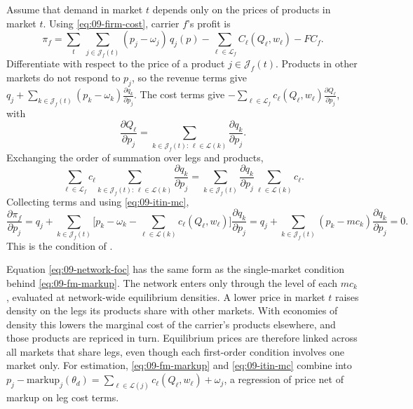 Assume that demand in market $t$ depends only on the prices of products in market $t$. Using
\eqref{eq:09-firm-cost}, carrier $f$'s profit is
\begin{equation*}
\pi_f=\sum_t\ \sum_{j\in\mathcal{J}_f(t)}(p_j-\omega_j)\,q_j(p)-\sum_{\ell\in\mathcal{L}_f}C_\ell(Q_\ell,w_\ell)-FC_f .
\end{equation*}
Differentiate with respect to the price of a product $j\in\mathcal{J}_f(t)$. Products in other markets do
not respond to $p_j$, so the revenue terms give
$q_j+\sum_{k\in\mathcal{J}_f(t)}(p_k-\omega_k)\frac{\partial q_k}{\partial p_j}$. The cost terms give
$-\sum_{\ell\in\mathcal{L}_f}c_\ell(Q_\ell,w_\ell)\frac{\partial Q_\ell}{\partial p_j}$, with
\begin{equation*}
\frac{\partial Q_\ell}{\partial p_j}=\sum_{k\in\mathcal{J}_f(t):\,\ell\in\mathcal{L}(k)}\frac{\partial q_k}{\partial p_j}.
\end{equation*}
Exchanging the order of summation over legs and products,
\begin{equation*}
\sum_{\ell\in\mathcal{L}_f}c_\ell\sum_{k\in\mathcal{J}_f(t):\,\ell\in\mathcal{L}(k)}\frac{\partial q_k}{\partial p_j}
=\sum_{k\in\mathcal{J}_f(t)}\frac{\partial q_k}{\partial p_j}\sum_{\ell\in\mathcal{L}(k)}c_\ell .
\end{equation*}
Collecting terms and using \eqref{eq:09-itin-mc},
\begin{equation}\label{eq:09-network-foc}
\frac{\partial\pi_f}{\partial p_j}
=q_j+\sum_{k\in\mathcal{J}_f(t)}\Big[p_k-\omega_k-\sum_{\ell\in\mathcal{L}(k)}c_\ell(Q_\ell,w_\ell)\Big]\frac{\partial q_k}{\partial p_j}
=q_j+\sum_{k\in\mathcal{J}_f(t)}(p_k-mc_k)\frac{\partial q_k}{\partial p_j}=0 .
\end{equation}
This is the condition of \citet[p.~15]{BerryCarnallSpiller2006}.

Equation \eqref{eq:09-network-foc} has the same form as the single-market condition behind
\eqref{eq:09-fm-markup}. The network enters only through the level of each $mc_k$, evaluated at
network-wide equilibrium densities. A lower price in market $t$ raises density on the legs its products
share with other markets. With economies of density this lowers the marginal cost of the carrier's
products elsewhere, and those products are repriced in turn. Equilibrium prices are therefore linked
across all markets that share legs, even though each first-order condition involves one market only. For
estimation, \eqref{eq:09-fm-markup} and \eqref{eq:09-itin-mc} combine into
$p_j-\text{markup}_j(\theta_d)=\sum_{\ell\in\mathcal{L}(j)}c_\ell(Q_\ell,w_\ell)+\omega_j$, a regression of
price net of markup on leg cost terms.

